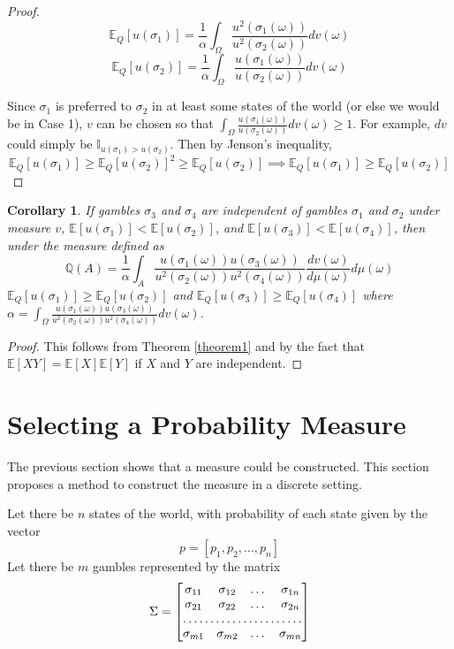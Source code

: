 \documentclass{article}
\newtheorem{corollary}{Corollary}
\begin{document}
\begin{proof}
\[\mathbb{E}_Q[u(\sigma_1)]=\frac{1}{\alpha} \int_\Omega \frac{u^2(\sigma_1(\omega))}{u^2(\sigma_2(\omega))} dv(\omega)\]
\[\mathbb{E}_Q[u(\sigma_2)]=\frac{1}{\alpha} \int_\Omega \frac{u(\sigma_1(\omega))}{u(\sigma_2(\omega))} dv(\omega)\]

Since \(\sigma_1\) is preferred to \(\sigma_2\) in at least some states of the world (or else we would be in Case 1), \(v\) can be chosen so that \(\int_\Omega \frac{u(\sigma_1(\omega))}{u(\sigma_2(\omega))} dv(\omega)\geq 1\).  For example, \(dv\) could simply be \(\mathbb{I}_{u(\sigma_1)>u(\sigma_2)}\).  Then by Jenson's inequality, 
\[\mathbb{E}_Q[u(\sigma_1)] \geq   \mathbb{E}_Q[u(\sigma_2)]^2 \geq  \mathbb{E}_Q[u(\sigma_2)] \implies \mathbb{E}_Q[u(\sigma_1)] \geq \mathbb{E}_Q[u(\sigma_2)] \]

\end{proof}

\begin{corollary}\label{corr1}
	If gambles \(\sigma_3\) and \(\sigma_4\) are independent of gambles \(\sigma_1\) and \(\sigma_2\) under measure \(v\), \(\mathbb{E}[u(\sigma_1)] < \mathbb{E}[u(\sigma_2)]\), and \(\mathbb{E}[u(\sigma_3)] < \mathbb{E}[u(\sigma_4)]\), then under the measure defined as 
	\[\mathbb{Q}(A)=\frac{1}{\alpha}\int_A \frac{u(\sigma_1(\omega))u(\sigma_3(\omega))}{u^2(\sigma_2(\omega))u^2(\sigma_4(\omega))} \frac{dv(\omega) }{ d\mu(\omega)} d\mu(\omega)\]
	\(\mathbb{E}_Q[u(\sigma_1)]\geq\mathbb{E}_Q[u(\sigma_2)]\) and \(\mathbb{E}_Q[u(\sigma_3)]\geq\mathbb{E}_Q[u(\sigma_4)]\) where 
	\\
	\(\alpha=\int_\Omega \frac{u(\sigma_1(\omega))u(\sigma_3(\omega))}{u^2(\sigma_2(\omega))u^2(\sigma_4(\omega))} dv(\omega) \).
\end{corollary}

\begin{proof}
This follows from Theorem \ref{theorem1} and by the fact that \(\mathbb{E}[XY]=\mathbb{E}[X]\mathbb{E}[Y]\) if \(X\) and \(Y\) are independent.  
\end{proof}

\section{Selecting a Probability Measure}

The previous section shows that a measure could be constructed.  This section proposes a method to construct the measure in a discrete setting.

Let there be \(n\) states of the world, with probability of each state given by the vector 
\[p = [p_1, p_2, \dotsc, p_n]\]  
Let there be \(m\) gambles represented by the matrix 
\[\Sigma = \begin{bmatrix}
    \sigma_{11}       & \sigma_{12} & \dots & \sigma_{1n} \\
    \sigma_{21}       & \sigma_{22}  & \dots & \sigma_{2n} \\
    \hdotsfor{4} \\
    \sigma_{m1}       & \sigma_{m2} & \dots & \sigma_{mn}
\end{bmatrix}\]
\end{document}

